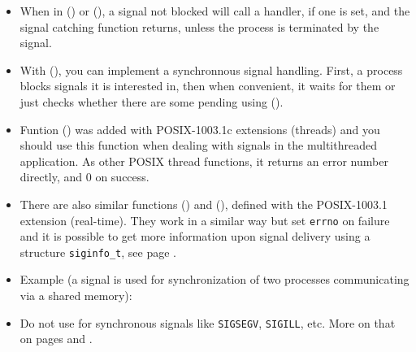\begin{itemize}
\item When in () or (), a signal not blocked will
call a handler, if one is set, and the signal catching function returns, unless
the process is terminated by the signal.
\item With (), you can implement a synchronnous signal
handling.  First, a process blocks signals it is interested in, then when
convenient, it waits for them or just checks whether there are some pending
using ().
\item \label{SIGWAIT} Funtion () was added with POSIX-1003.1c
extensions (threads) and you should use this function when dealing with signals
in the multithreaded application.  As other POSIX thread functions, it returns
an error number directly, and 0 on success.
\item \label{SIGWAITINFO} There are also similar functions ()
and (), defined with the POSIX-1003.1 extension
(real-time).  They work in a similar way but set \texttt{errno} on failure and
it is possible to get more information upon signal delivery using a structure
\texttt{siginfo\_t}, see page \pageref{REALTIMEEXTENSIONS}.
\item Example (a signal is used for synchronization of two processes
communicating via a shared memory): 
\item Do not use for synchronous signals like \texttt{SIGSEGV}, \texttt{SIGILL},
etc.  More on that on pages \pageref{SPECIALSIGNALS} and
\pageref{THREADS_SIGWAIT}. 
\end{itemize}

\endinput
